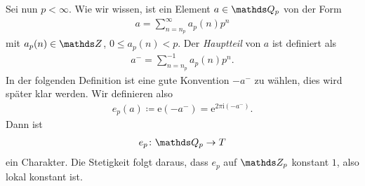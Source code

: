 Sei nun $p<\infty$. Wie wir wissen, ist ein Element $a\in \Q_p$ von der Form
\begin{align*}
a=\sum_{n=n_p}^\infty a_p(n)p^n
\end{align*}
mit $a_p(n)\in \Z$, $0\leq a_p(n)<p$.
Der  \emph{Hauptteil} von $a$ ist definiert als
\begin{align*}
a^-=\sum_{n=n_p}^{-1} a_p(n)p^n.
\end{align*}
In der folgenden Definition ist eine gute Konvention $-a^-$ zu wählen, dies wird später klar werden.
Wir definieren also
\begin{align*}
e_p(a)\coloneqq  \mathrm{e}(-a^-)=\mathrm{e}^{2\pi \mathrm{i}(-a^-)}.
\end{align*}
Dann ist
\begin{align*}
e_p \colon \Q_p \to T
\end{align*}
ein Charakter. Die Stetigkeit folgt daraus, dass $e_p$ auf $\Z_p$ konstant $1$, also lokal konstant ist.

